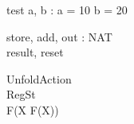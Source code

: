 \documentclass{llncs}
\begin{document}
\begin{schema}{test}
a, b : \nat
\where
a = 10 \land b = 20
\end{schema}
\begin{circus}
\circchannel store, add, out : NAT\\
\circchannel result, reset\\
\end{circus}
\begin{circus}
\circprocess UnfoldAction \circdef\\
	\circbegin \circstate RegSt \\
\circspot F(\circmu X \circspot F(X))\\
	\circend\\
\end{circus}
\end{document}

